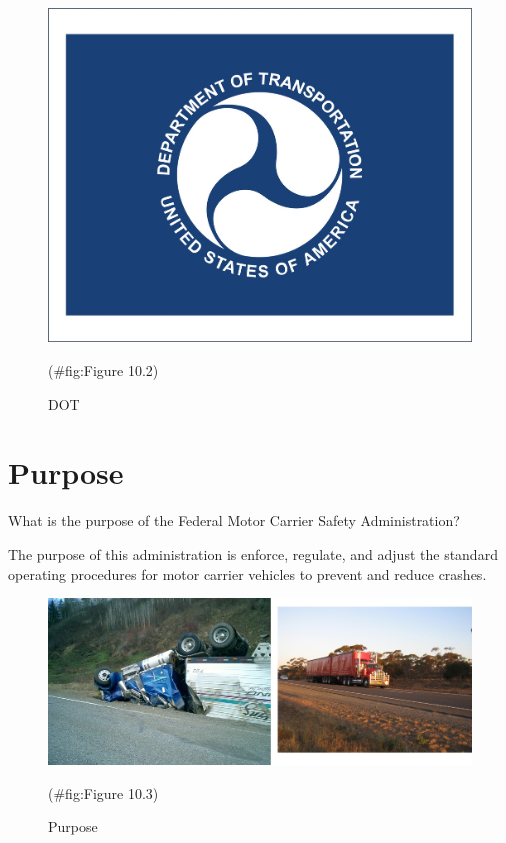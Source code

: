 \documentclass[
]{book}
\begin{document}
\begin{figure}

{\centering \includegraphics{./Images/Enforcement and Safety Organizations/DOT} 

}

\caption{DOT}(\#fig:Figure 10.2)
\end{figure}

\hypertarget{safety-Purpose}{%
\section{Purpose}\label{safety-Purpose}}

What is the purpose of the Federal Motor Carrier Safety Administration?

The purpose of this administration is enforce, regulate, and adjust the standard operating procedures for motor carrier vehicles to prevent and reduce crashes.

\begin{figure}

{\centering \includegraphics{./Images/Enforcement and Safety Organizations/Purpose} 

}

\caption{Purpose}(\#fig:Figure 10.3)
\end{figure}
\end{document}
